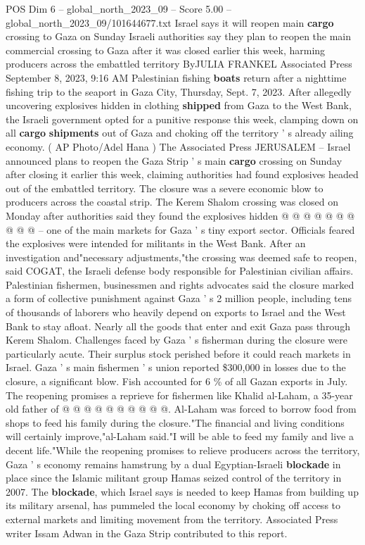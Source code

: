 \begin{textsample}{POS Dim 6 – global\_north\_2023\_09 – Score 5.00 – global\_north\_2023\_09/101644677.txt}  \label{ex:f6_pos_071}
Israel says it will reopen main \textbf{cargo} crossing to Gaza on Sunday Israeli authorities say they plan to reopen the main commercial crossing to Gaza after it was closed earlier this week, harming producers across the embattled territory ByJULIA FRANKEL Associated Press September 8, 2023, 9:16 AM Palestinian fishing \textbf{boats} return after a nighttime fishing trip to the seaport in Gaza City, Thursday, Sept. 7, 2023.
After allegedly uncovering explosives hidden in clothing \textbf{shipped} from Gaza to the West Bank, the Israeli government opted for a punitive response this week, clamping down on all \textbf{cargo} \textbf{shipments} out of Gaza and choking off the territory ' s already ailing economy. ( AP Photo/Adel Hana ) The Associated Press JERUSALEM -- Israel announced plans to reopen the Gaza Strip ' s main \textbf{cargo} crossing on Sunday after closing it earlier this week, claiming authorities had found explosives headed out of the embattled territory.
The closure was a severe economic blow to producers across the coastal strip.
The Kerem Shalom crossing was closed on Monday after authorities said they found the explosives hidden @ @ @ @ @ @ @ @ @ @ -- one of the main markets for Gaza ' s tiny export sector.
Officials feared the explosives were intended for militants in the West Bank.
After an investigation and"necessary adjustments,"the crossing was deemed safe to reopen, said COGAT, the Israeli defense body responsible for Palestinian civilian affairs.
Palestinian fishermen, businessmen and rights advocates said the closure marked a form of collective punishment against Gaza ' s 2 million people, including tens of thousands of laborers who heavily depend on exports to Israel and the West Bank to stay afloat.
Nearly all the goods that enter and exit Gaza pass through Kerem Shalom.
Challenges faced by Gaza ' s fisherman during the closure were particularly acute.
Their surplus stock perished before it could reach markets in Israel.
Gaza ' s main fishermen ' s union reported \$300,000 in losses due to the closure, a significant blow.
Fish accounted for 6 \% of all Gazan exports in July.
The reopening promises a reprieve for fishermen like Khalid al-Laham, a 35-year old father of @ @ @ @ @ @ @ @ @ @.
Al-Laham was forced to borrow food from shops to feed his family during the closure."The financial and living conditions will certainly improve,"al-Laham said."I will be able to feed my family and live a decent life."While the reopening promises to relieve producers across the territory, Gaza ' s economy remains hamstrung by a dual Egyptian-Israeli \textbf{blockade} in place since the Islamic militant group Hamas seized control of the territory in 2007.
The \textbf{blockade}, which Israel says is needed to keep Hamas from building up its military arsenal, has pummeled the local economy by choking off access to external markets and limiting movement from the territory.
Associated Press writer Issam Adwan in the Gaza Strip contributed to this report.

\end{textsample}
